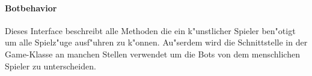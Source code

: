 \paragraph{Botbehavior}
Dieses Interface beschreibt alle Methoden die ein k"unstlicher Spieler ben"otigt um alle Spielz"uge ausf"uhren zu k"onnen. Au"serdem wird die Schnittstelle in der Game-Klasse an manchen Stellen verwendet um die Bots von dem menschlichen Spieler zu unterscheiden. 